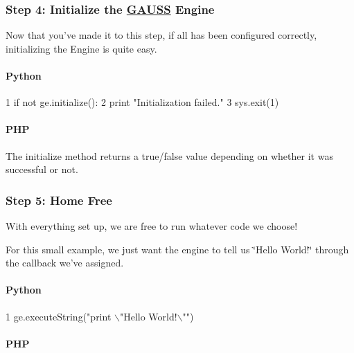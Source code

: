 \subsubsection*{Step 4\-: Initialize the \hyperlink{class_g_a_u_s_s}{G\-A\-U\-S\-S} Engine}

Now that you've made it to this step, if all has been configured correctly, initializing the Engine is quite easy.

\paragraph*{Python}


\begin{DoxyCode}
1 \textcolor{keywordflow}{if} \textcolor{keywordflow}{not} ge.initialize():
2     \textcolor{keywordflow}{print} \textcolor{stringliteral}{"Initialization failed."}
3     sys.exit(1)
\end{DoxyCode}
 \paragraph*{P\-H\-P}




The {\ttfamily initialize} method returns a true/false value depending on whether it was successful or not.

\subsubsection*{Step 5\-: Home Free}

With everything set up, we are free to run whatever code we choose!

For this small example, we just want the engine to tell us \char`\"{}\-Hello World!\char`\"{} through the callback we've assigned.

\paragraph*{Python}


\begin{DoxyCode}
1 ge.executeString(\textcolor{stringliteral}{"print \(\backslash\)"Hello World!\(\backslash\)""})
\end{DoxyCode}
 \paragraph*{P\-H\-P}


